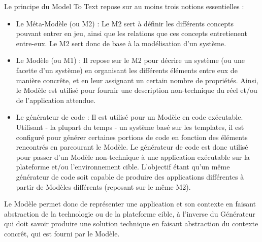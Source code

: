 Le principe du Model To Text repose sur au moins trois notions essentielles :
\begin{itemize}
\item Le Méta-Modèle (ou M2) : Le M2 sert à définir les différents concepts pouvant entrer en jeu, ainsi que les relations que ces concepts entretienent entre-eux. Le M2 sert donc de base à la modélisation d'un système.
\item Le Modèle (ou M1) : Il repose sur le M2 pour décrire un système (ou une facette d'un système) en organisant les différents éléments entre eux de manière concrête, et en leur assignant un certain nombre de propriétés. Ainsi, le Modèle est utilisé pour fournir une description non-technique du réel et/ou de l'application attendue.
\item Le générateur de code : Il est utilisé pour  un Modèle en code exécutable. Utilisant - la plupart du temps - un système basé sur les templates, il est configuré pour générer certaines portions de code en fonction des éléments rencontrés en parcourant le Modèle. Le générateur de code est donc utilisé pour passer d'un Modèle non-technique à une application exécutable sur la plateforme et/ou l'environnement cible. L'objectif étant qu'un même générateur de code soit capable de produire des applications différentes à partir de Modèles différents (reposant sur le même M2).\\
\end{itemize}

Le Modèle permet donc de représenter une application et son contexte en faisant abstraction de la technologie ou de la plateforme cible, à l'inverse du Générateur qui doit savoir produire une solution technique en faisant abstraction du contexte concrêt, qui est fourni par le Modèle.




